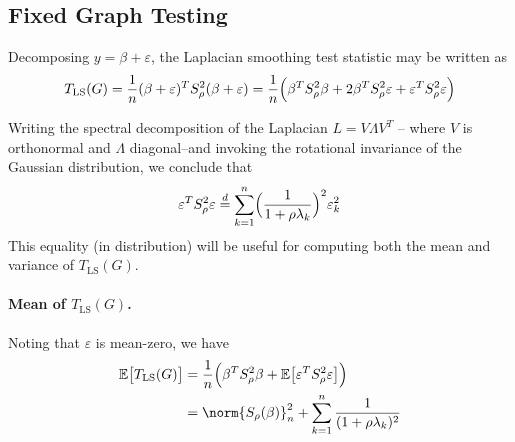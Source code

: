\documentclass{article}
\newcommand{\1}{\mathbf{1}}
\newcommand{\Ebb}{\mathbb{E}}
\newcommand{\LS}{\mathrm{LS}}
\theoremstyle{alden}
\theoremstyle{aldenthm}
\theoremstyle{definition}
\theoremstyle{remark}
\begin{document}
\subsection{Fixed Graph Testing}
Decomposing $y = \beta + \varepsilon$, the Laplacian smoothing test statistic may be written as
\begin{equation*}
T_{\LS}(G) = \frac{1}{n}(\beta + \varepsilon)^T S_{\rho}^{2} (\beta + \varepsilon) = \frac{1}{n} \Bigl(\beta^T S_\rho^{2} \beta + 2 \beta^T S_{\rho}^{2} \varepsilon + \varepsilon^T S_{\rho}^{2} \varepsilon \Bigr)
\end{equation*}

Writing the spectral decomposition of the Laplacian $L = V \Lambda V^T$ -- where $V$ is orthonormal and $\Lambda$ diagonal--and invoking the rotational invariance of the Gaussian distribution, we conclude that
\begin{equation}
\label{eqn:fixed_graph_ls_pf3}
\varepsilon^T S_{\rho}^2 \varepsilon \overset{d}{=} \sum_{k = 1}^{n} \Bigl(\frac{1}{1 + \rho \lambda_k}\Bigr)^2 \varepsilon_k^2
\end{equation}
This equality (in distribution) will be useful for computing both the mean and variance of $T_{\LS}(G)$.

\paragraph{Mean of $T_{\LS}(G)$.}

Noting that $\varepsilon$ is mean-zero, we have
\begin{align}
\Ebb\bigl[T_{\LS}(G)\bigr] & = \frac{1}{n}\Bigl(\beta^T S_\rho^{2} \beta + \Ebb\bigl[\varepsilon^T S_{\rho}^{2} \varepsilon\bigr] \Bigr) \nonumber \\
& = \norm{S_{\rho}(\beta)}_n^2 + \sum_{k = 1}^{n} \frac{1}{(1 + \rho \lambda_k)^2} \label{eqn:fixed_graph_ls_pf2}
\end{align}
\end{document}
